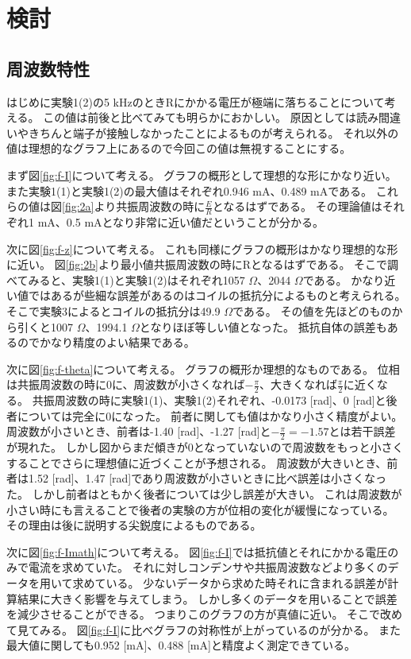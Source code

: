 \documentclass[11pt,a4paper,fleqn]{jsarticle}
\begin{document}
\section{検討}
\subsection{周波数特性}
はじめに実験1(2)の5 kHzのときRにかかる電圧が極端に落ちることについて考える。
この値は前後と比べてみても明らかにおかしい。
原因としては読み間違いやきちんと端子が接触しなかったことによるものが考えられる。
それ以外の値は理想的なグラフ上にあるので今回この値は無視することにする。

まず図\ref{fig:f-I}について考える。
グラフの概形として理想的な形にかなり近い。
また実験1(1)と実験1(2)の最大値はそれぞれ0.946 mA、0.489 mAである。
これらの値は図\ref{fig:2a}より共振周波数の時に$\frac{E}{R}$となるはずである。
その理論値はそれぞれ1 mA、0.5 mAとなり非常に近い値だということが分かる。

次に図\ref{fig:f-z}について考える。
これも同様にグラフの概形はかなり理想的な形に近い。
図\ref{fig:2b}より最小値共振周波数の時にRとなるはずである。
そこで調べてみると、実験1(1)と実験1(2)はそれぞれ1057 $\Omega$、2044 $\Omega$である。
かなり近い値ではあるが些細な誤差があるのはコイルの抵抗分によるものと考えられる。
そこで実験3によるとコイルの抵抗分は49.9 $\Omega$である。
その値を先ほどのものから引くと1007 $\Omega$、1994.1 $\Omega$となりほぼ等しい値となった。
抵抗自体の誤差もあるのでかなり精度のよい結果である。

次に図\ref{fig:f-theta}について考える。
グラフの概形か理想的なものである。
位相は共振周波数の時に0に、周波数が小さくなれば$-\frac{\pi}{2}$、大きくなれば$\frac{\pi}{2}$に近くなる。
共振周波数の時に実験1(1)、実験1(2)それぞれ、-0.0173 [rad]、0 [rad]と後者については完全に0になった。
前者に関しても値はかなり小さく精度がよい。
周波数が小さいとき、前者は-1.40 [rad]、-1.27 [rad]と$-\frac{\pi}{2}=-1.57$とは若干誤差が現れた。
しかし図からまだ傾きが0となっていないので周波数をもっと小さくすることでさらに理想値に近づくことが予想される。
周波数が大きいとき、前者は1.52 [rad]、1.47 [rad]であり周波数が小さいときに比べ誤差は小さくなった。
しかし前者はともかく後者については少し誤差が大きい。
これは周波数が小さい時にも言えることで後者の実験の方が位相の変化が緩慢になっている。
その理由は後に説明する尖鋭度によるものである。

次に図\ref{fig:f-Imath}について考える。
図\ref{fig:f-I}では抵抗値とそれにかかる電圧のみで電流を求めていた。
それに対しコンデンサや共振周波数などより多くのデータを用いて求めている。
少ないデータから求めた時それに含まれる誤差が計算結果に大きく影響を与えてしまう。
しかし多くのデータを用いることで誤差を減少させることができる。
つまりこのグラフの方が真値に近い。
そこで改めて見てみる。
図\ref{fig:f-I}に比べグラフの対称性が上がっているのが分かる。
また最大値に関しても0.952 [mA]、0.488 [mA]と精度よく測定できている。
\end{document}
